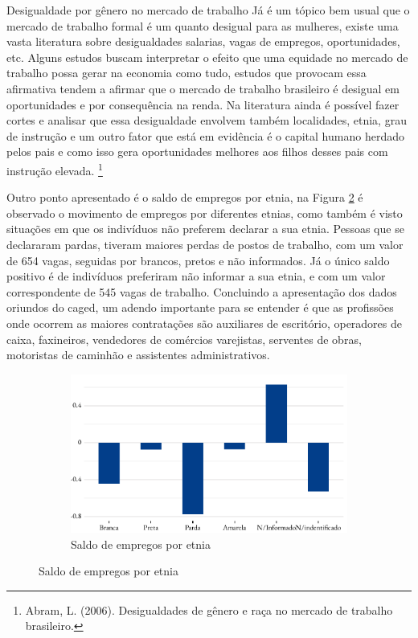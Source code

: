 \begin{smbox}[label={labelbox},nameref={Desigualdade por gênero}]{Desigualdade por gênero no mercado de trabalho}
	Já é um tópico bem usual que o mercado de trabalho formal é um quanto desigual para as mulheres, existe uma vasta literatura sobre desigualdades salarias, vagas de empregos, oportunidades, etc. Alguns estudos buscam interpretar o efeito que uma equidade no mercado de trabalho possa gerar na economia como tudo, estudos que provocam essa afirmativa tendem a afirmar que o mercado de trabalho brasileiro é desigual em oportunidades e por consequência na renda. Na literatura ainda é possível fazer cortes e analisar que essa desigualdade envolvem também localidades, etnia, grau de instrução e um outro fator que está em evidência é o capital humano herdado pelos pais e como isso gera oportunidades melhores aos filhos desses pais com instrução elevada. 
	\footnote{Abram, L. (2006). Desigualdades de gênero e raça no mercado de trabalho brasileiro.}
	
\end{smbox}



\par Outro ponto apresentado é o saldo de empregos por etnia, na Figura \ref{fig:sel2020} é observado o movimento de empregos por diferentes etnias, como também é visto situações em que os indivíduos não preferem declarar a sua etnia. Pessoas que se declararam pardas, tiveram maiores perdas de postos de trabalho, com um valor de 654 vagas, seguidas por brancos, pretos e não informados. Já o único saldo positivo é de indivíduos preferiram não informar a sua etnia, e com um valor correspondente de 545 vagas de trabalho. Concluindo a apresentação dos dados oriundos do \acrshort{caged}, um adendo importante para se entender é que as profissões onde ocorrem as maiores contratações são auxiliares de escritório, operadores de caixa, faxineiros, vendedores de comércios varejistas, serventes de obras, motoristas de caminhão e assistentes administrativos.


\begin{figure}[!h]
\begin{subfigure}{\linewidth}
	\caption{Saldo de empregos por etnia}
	\label{fig:sel2020}
	\includegraphics{fig/Saldo por etnia.pdf}
\end{subfigure}
\end{figure}




